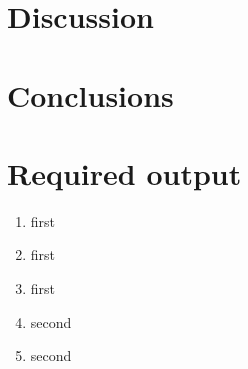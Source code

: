 \documentclass{article}
\begin{document}
\section{Discussion}

\section{Conclusions}

\printbibliography
\appendix 

\section{Required output}

\begin{enumerate}
    \item first
    \item first
    \item first
    \item second
    \item second
\end{enumerate}
\end{document}
